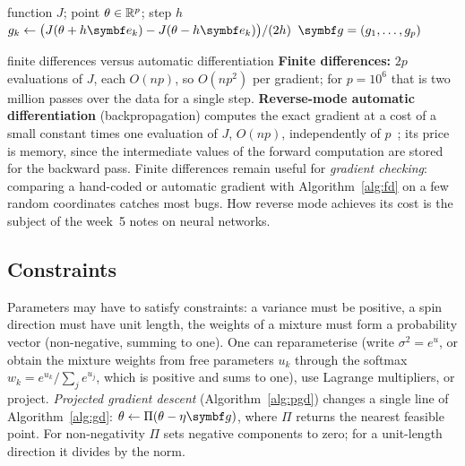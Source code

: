 \documentclass[11pt]{article}
\newcommand{\gvec}{\vect{g}}
\newcommand{\evec}{\vect{e}}
\begin{document}
\begin{algorithm}[tb]
\caption{Gradient by central differences}\label{alg:fd}
\begin{algorithmic}[1]
\Require function $J$; point $\theta \in \mathbb{R}^p$; step $h$
    \State $g_k \gets \big(J(\theta + h\evec_k) - J(\theta - h\evec_k)\big)/(2h)$ 
  \EndFor
  \State \Return $\gvec = (g_1, \dots, g_p)$
\EndFunction
\end{algorithmic}
\end{algorithm}


\begin{runtime}{finite differences versus automatic differentiation}
\textbf{Finite differences:} $2p$ evaluations of $J$, each $O(np)$, so $O(np^2)$ per gradient; for $p = 10^6$ that is
two million passes over the data for a single step. \textbf{Reverse-mode automatic differentiation} (backpropagation)
computes the exact gradient at a cost of a small constant times one evaluation of $J$, $O(np)$, independently of
$p$~\cite{baydin2018}; its price is memory, since the intermediate values of the forward computation are stored for the
backward pass. Finite differences remain useful for \emph{gradient checking}: comparing a hand-coded or automatic
gradient with Algorithm~\ref{alg:fd} on a few random coordinates catches most bugs. How reverse mode achieves its
cost is the subject of the week~5 notes on neural networks.
\end{runtime}

\subsection{Constraints}\label{sec:constraints}

Parameters may have to satisfy constraints: a variance must be positive, a spin direction must have unit length, the
weights of a mixture must form a probability vector (non-negative, summing to one). One can reparameterise (write
$\sigma^2 = e^u$, or obtain the mixture weights from free parameters $u_k$ through the softmax
$w_k = e^{u_k}/\sum_j e^{u_j}$, which is positive and sums to one), use Lagrange multipliers, or project.
\emph{Projected gradient descent} (Algorithm~\ref{alg:pgd}) changes a single line of Algorithm~\ref{alg:gd}:
$\theta \gets \Pi(\theta - \eta\gvec)$, where $\Pi$ returns the nearest feasible point. For non-negativity $\Pi$ sets
negative components to zero; for a unit-length direction it divides by the norm.
\end{document}
